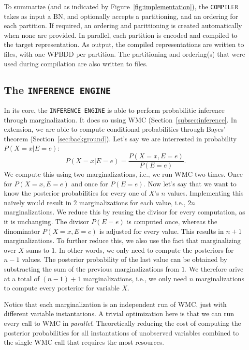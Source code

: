 To summarize (and as indicated by Figure~\ref{fig:implementation}), the \texttt{COMPILER} takes as input a BN, and optionally accepts a partitioning, and an ordering for each partition. If required, an ordering and parittioning is created automatically when none are provided. In parallel, each partition is encoded and compiled to the target representation. As output, the compiled representations are written to files, with one WPBDD per partition. The partitioning and ordering(s) that were used during compilation are also written to files.

\subsection{The \texttt{INFERENCE ENGINE}}

In its core, the \texttt{INFERENCE ENGINE} is able to perform probabilitic inference through marginalization. It does so using WMC (Section~\ref{subsec:inference}. In extension, we are able to compute conditional probabilities through Bayes' theorem (Section~\ref{sec:background}). Let's say we are interrested in probability $P(X = x | E = e)$:  \[P(X = x | E = e) = \frac{P(X = x, E = e)}{P(E = e)}.\]
We compute this using two marginalizations, i.e., we run WMC two times. Once for $P(X = x, E = e)$ and once for $P(E = e)$. Now let's say that we want to know the posterior probabilities for every one of $X$'s $n$ values. Implementing this na\"ively would result in $2$ marginalizations for each value, i.e., $2n$ marginalizations. We reduce this by reusing the divisor for every computation, as it is unchanging. The divisor $P(E = e)$ is computed once, whereas the dinominator $P(X = x, E = e)$ is adjusted for every value. This results in $n + 1$ marginalizations. To further reduce this, we also use the fact that marginalizing over $X$ sums to $1$. In other words, we only need to compute the posteriors for $n-1$ values. The posterior probability of the last value can be obtained by substracting the sum of the previous marginalizations from $1$. We therefore arive at a total of $(n-1) + 1$ marginalizations, i.e., we only need $n$ marginalizations to compute every posterior for variable $X$.

Notice that each marginalization is an independent run of WMC, just with different variable instantations. A trivial optimization here is that we can run every call to WMC in \emph{parallel}. Theoretically reducing the cost of computing the posterior probabilities for all instantations of unobserved variables combined to the single WMC call that requires the most resources.

